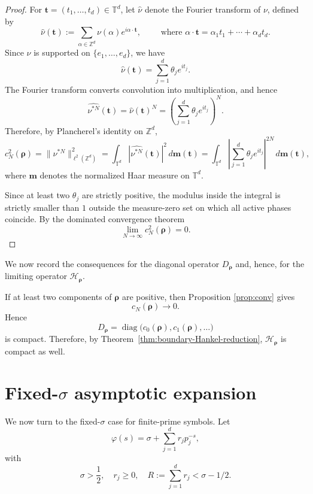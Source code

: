 \documentclass[12pt, reqno]{amsart}
\numberwithin{equation}{section}
\begin{document}
\begin{proof}
For $\mathbf t=(t_1,\ldots,t_d)\in\mathbb T^d$, let
$\widehat{\nu}$ denote the Fourier transform of $\nu$, defined by
\[
\widehat{\nu}(\mathbf t)
:=
\sum_{\alpha\in\mathbb Z^d}
\nu(\alpha)e^{i\alpha\cdot\mathbf t}, \qquad
 \text{ where } \alpha\cdot\mathbf t
= \alpha_1t_1+\cdots+\alpha_dt_d.\]
Since $\nu$ is supported on $\{e_1,\ldots,e_d\}$, we have
\[
\widehat{\nu}(\mathbf t)
=
\sum_{j=1}^d\theta_j e^{it_j}.
\]
The Fourier transform converts convolution into multiplication, and
hence
\[
\widehat{\nu^{*N}}(\mathbf t)
=
\widehat{\nu}(\mathbf t)^N
=
\left(
\sum_{j=1}^d\theta_j e^{it_j}
\right)^N.
\]
Therefore, by Plancherel's identity on $\mathbb Z^d$,
\[
c_N^2(\boldsymbol{\rho})
=
\|\nu^{*N}\|_{\ell^2(\mathbb Z^d)}^2
=
\int_{\mathbb T^d}
|\widehat{\nu^{*N}}(\mathbf t)|^2
\,d\mathbf m(\mathbf t)
=
\int_{\mathbb T^d}
\left|
\sum_{j=1}^d\theta_j e^{it_j}
\right|^{2N}
\,d\mathbf m(\mathbf t),
\]
where $\mathbf m$ denotes the normalized Haar measure on
$\mathbb T^d$.

Since at least two $\theta_j$ are strictly positive, the modulus inside the integral is strictly smaller than $1$ outside the measure-zero set on which all active phases coincide.
 By the dominated convergence theorem
\[
\lim_{N\to\infty}c_N^2(\boldsymbol{\rho})=0.
\]

\end{proof}
We now record the consequences for the
diagonal operator $D_{\boldsymbol{\rho}}$ and, hence, for the limiting
operator $\mathcal H_{\boldsymbol{\rho}}$.

If at least two components of $\boldsymbol{\rho}$ are positive, then
 Proposition \ref{prop:conv} gives
\[
c_N(\boldsymbol{\rho})\longrightarrow0.
\]
Hence
\[
D_{\boldsymbol{\rho}}
=
\operatorname{diag}
\bigl(c_0(\boldsymbol{\rho}),
c_1(\boldsymbol{\rho}),\ldots\bigr)
\]
is compact. Therefore, by Theorem~\ref{thm:boundary-Hankel-reduction},
$\mathcal H_{\boldsymbol{\rho}}$
is compact as well.

\section{Fixed-\texorpdfstring{$\sigma$}{sigma} asymptotic expansion}
\label{sec:4}

We now turn to the fixed-$\sigma$ case for finite-prime symbols. Let
$$\varphi(s)=\sigma+\sum_{j=1}^{d}r_jp_j^{-s},$$ with
 \begin{equation}\label{eq:fixed-sigma}
    \sigma>\frac12,\quad r_j\geq0, \quad R:=\sum_{j=1}^{d}r_j<\sigma-1/2.
\end{equation}
\end{document}
